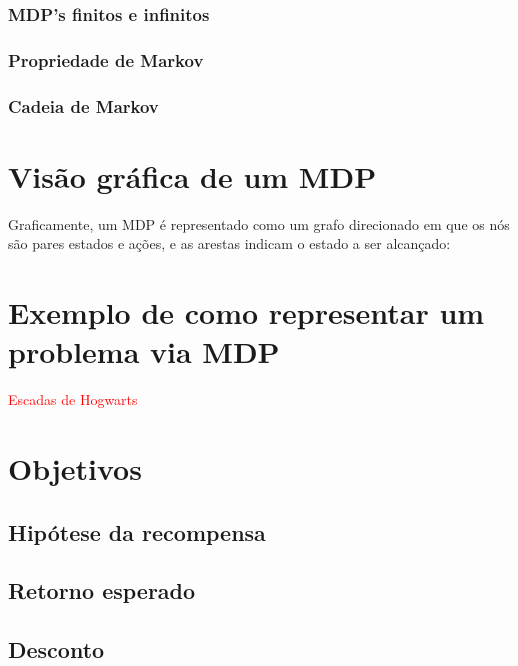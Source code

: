 \documentclass{article}
\begin{document}
            \subsubsection{MDP's finitos e infinitos}
            
            \subsubsection{Propriedade de Markov}
            
            \subsubsection{Cadeia de Markov}
        
    \section{Visão gráfica de um MDP}
    
        Graficamente, um MDP é representado como um grafo direcionado em que os nós são pares estados e ações, e as arestas indicam o estado a ser alcançado:
    
        \begin{center}
        \mdpbig
        \end{center}
        
    \section{Exemplo de como representar um problema via MDP}
    
        \textcolor{red}{Escadas de Hogwarts}
    
    \section{Objetivos}
    
        \subsection{Hipótese da recompensa}
    
        \subsection{Retorno esperado}
        
        \subsection{Desconto}
        
\end{document}

